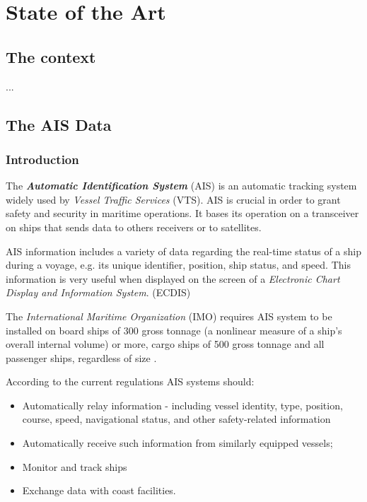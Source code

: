 \chapter{State of the Art}

\section{The context}

    ...
    
\newpage
\section{The AIS Data}

    \subsection{Introduction}
    
    The \textit{\textbf{Automatic Identification System}} (AIS) is an automatic tracking system widely used by \textit{Vessel Traffic Services} (VTS). AIS is crucial in order to grant safety and security in maritime operations.
    It bases its operation on a transceiver on ships that sends data to others receivers or to satellites.
    
    AIS information includes a variety of data regarding the real-time status of a ship during a voyage, e.g. its unique identifier, position, ship status, and speed. This information is very useful when displayed on the screen of a \textit{Electronic Chart Display and Information System}. (ECDIS)
    
    The \textit{International Maritime Organization} (IMO) requires AIS system to be installed on board ships of 300 gross tonnage (a nonlinear measure of a ship's overall internal volume) or more, cargo ships of 500 gross tonnage and all passenger ships, regardless of size \cite{ais_regulations}.
    
    According to the current regulations AIS systems should:
    \begin{itemize}
        \item Automatically relay information - including vessel identity, type, position, course, speed, navigational status, and other safety-related information
        \item Automatically receive such information from similarly equipped vessels; 
        \item Monitor and track ships
        \item Exchange data with coast facilities.
    \end{itemize}

